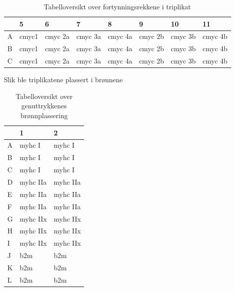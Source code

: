 \documentclass[
  letterpaper,
  DIV=11,
  numbers=noendperiod]{scrreprt}
\begin{document}
\begingroup
\fontsize{12.0pt}{14.4pt}\selectfont
\setlength{\LTpost}{0mm}

\begin{longtable}{llllllll}

\caption{\label{tbl-fortynning}Tabelloversikt over fortynningsrekkene i
triplikat}

\tabularnewline

\toprule
 & 5 & 6 & 7 & 8 & 9 & 10 & 11 \\ 
\midrule\addlinespace[2.5pt]
A & cmyc1 & cmyc 2a & cmyc 3a & cmyc 4a & cmyc 2b & cmyc 3b & cmyc 4b \\ 
B & cmyc1 & cmyc 2a & cmyc 3a & cmyc 4a & cmyc 2b & cmyc 3b & cmyc 4b \\ 
C & cmyc1 & cmyc 2a & cmyc 3a & cmyc 4a & cmyc 2b & cmyc 3b & cmyc 4b \\ 
\bottomrule

\end{longtable}

\begin{minipage}{\linewidth}
Slik ble triplikatene plassert i brønnene\\
\end{minipage}
\endgroup

\begingroup
\fontsize{12.0pt}{14.4pt}\selectfont
\setlength{\LTpost}{0mm}

\begin{longtable}{lll}

\caption{\label{tbl-gener}Tabelloversikt over genuttrykkenes
brønnplassering}

\tabularnewline

\toprule
 & 1 & 2 \\ 
\midrule\addlinespace[2.5pt]
A & myhc I & myhc I \\ 
B & myhc I & myhc I \\ 
C & myhc I & myhc I \\ 
D & myhc IIa & myhc IIa \\ 
E & myhc IIa & myhc IIa \\ 
F & myhc IIa & myhc IIa \\ 
G & myhc IIx & myhc IIx \\ 
H & myhc IIx & myhc IIx \\ 
I & myhc IIx & myhc IIx \\ 
J & b2m & b2m \\ 
K & b2m & b2m \\ 
L & b2m & b2m \\ 
\bottomrule

\end{longtable}
\end{document}
